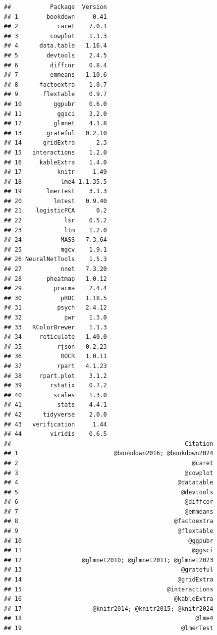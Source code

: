 \documentclass[a4paper, nobind]{templates/ociamthesis}
\begin{document}
\begin{verbatim}
##           Package  Version
## 1        bookdown     0.41
## 2           caret    7.0.1
## 3         cowplot    1.1.3
## 4      data.table   1.16.4
## 5        devtools    2.4.5
## 6         diffcor    0.8.4
## 7         emmeans   1.10.6
## 8      factoextra    1.0.7
## 9       flextable    0.9.7
## 10         ggpubr    0.6.0
## 11          ggsci    3.2.0
## 12         glmnet    4.1.8
## 13       grateful   0.2.10
## 14      gridExtra      2.3
## 15   interactions    1.2.0
## 16     kableExtra    1.4.0
## 17          knitr     1.49
## 18           lme4 1.1.35.5
## 19       lmerTest    3.1.3
## 20         lmtest   0.9.40
## 21    logisticPCA      0.2
## 22            lsr    0.5.2
## 23            ltm    1.2.0
## 24           MASS   7.3.64
## 25           mgcv    1.9.1
## 26 NeuralNetTools    1.5.3
## 27           nnet   7.3.20
## 28       pheatmap   1.0.12
## 29         pracma    2.4.4
## 30           pROC   1.18.5
## 31          psych   2.4.12
## 32            pwr    1.3.0
## 33   RColorBrewer    1.1.3
## 34     reticulate   1.40.0
## 35          rjson   0.2.23
## 36           ROCR   1.0.11
## 37          rpart   4.1.23
## 38     rpart.plot    3.1.2
## 39        rstatix    0.7.2
## 40         scales    1.3.0
## 41          stats    4.4.1
## 42      tidyverse    2.0.0
## 43   verification     1.44
## 44        viridis    0.6.5
##                                                 Citation
## 1                           @bookdown2016; @bookdown2024
## 2                                                 @caret
## 3                                               @cowplot
## 4                                             @datatable
## 5                                              @devtools
## 6                                               @diffcor
## 7                                               @emmeans
## 8                                            @factoextra
## 9                                             @flextable
## 10                                               @ggpubr
## 11                                                @ggsci
## 12                 @glmnet2010; @glmnet2011; @glmnet2023
## 13                                             @grateful
## 14                                            @gridExtra
## 15                                         @interactions
## 16                                           @kableExtra
## 17                    @knitr2014; @knitr2015; @knitr2024
## 18                                                 @lme4
## 19                                             @lmerTest

\end{verbatim}
\end{document}

